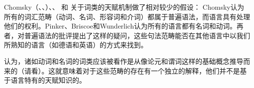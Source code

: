 Chomsky（\citeyear[]{Chomsky88a-u}、\citeyear{Chomsky91a-u}、\citeyear[]{Chomsky95a-u}）、\citet[, 286]{Pinker94a}、\citet[]{Briscoe2000a} 和
\citet[]{Wunderlich2004a}关于词类的天赋机制做了相对较少的假设：
Chomsky认为所有的词汇范畴（动词、名词、形容词和介词）都属于普遍语法，而语言具有处理他们的权利。Pinker、Briscoe和Wunderlich认为所有的语言都有名词和动词。再者，对普遍语法的批评提出了这样的疑问，这些句法范畴能否在其他语言中以我们所熟知的语言（如德语和英语）的方式来找到。

\citet[]{Braine87a} 认为，诸如动词和名词的词类应该被看作是从像论元和谓词这样的基础概念推导而来的（请看）。这就意味着对于这些范畴的存在有一个独立的解释，他们并不是基于语言特有的天赋知识的。

